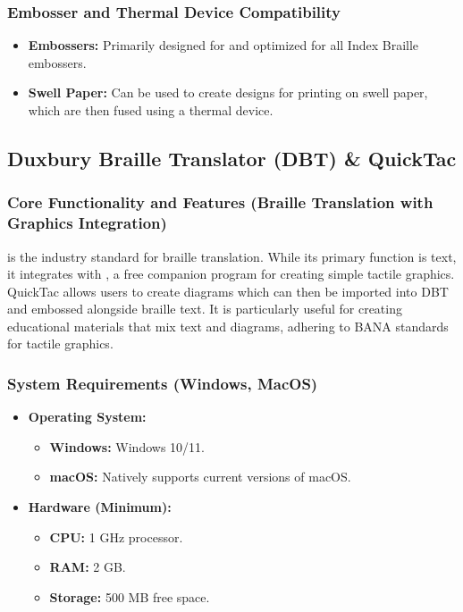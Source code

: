 \subsubsection{Embosser and Thermal Device Compatibility}\label{ch14:sssec:elpicsprint-compat}
\begin{itemize}
	\item \textbf{Embossers:} Primarily designed for and optimized for all Index Braille embossers.
	\item \textbf{Swell Paper:} Can be used to create designs for printing on swell paper, which are then fused using a thermal device.
\end{itemize}

\subsection{Duxbury Braille Translator (DBT) \& QuickTac}\label{ch14:ssec:dbt-quicktac}
\subsubsection{Core Functionality and Features (Braille Translation with Graphics Integration)}\label{ch14:sssec:dbt-features}
 is the industry standard for braille translation\supercite{DuxburyDBT, DuxburyDBTWin, DuxburyDBTMac}. While its primary function is text, it integrates with , a free companion program for creating simple tactile graphics. QuickTac allows users to create diagrams which can then be imported into DBT and embossed alongside braille text. It is particularly useful for creating educational materials that mix text and diagrams, adhering to BANA standards for tactile graphics.

\subsubsection{System Requirements (Windows, MacOS)}\label{ch14:sssec:dbt-sysreq}
\begin{itemize}
	\item \textbf{Operating System:}
	      \begin{itemize}
		      \item \textbf{Windows:} Windows 10/11.
		      \item \textbf{macOS:} Natively supports current versions of macOS.
	      \end{itemize}
	\item \textbf{Hardware (Minimum):}
	      \begin{itemize}
		      \item \textbf{CPU:} 1 GHz processor.
		      \item \textbf{RAM:} 2 GB.
		      \item \textbf{Storage:} 500 MB free space.
	      \end{itemize}
\end{itemize}

